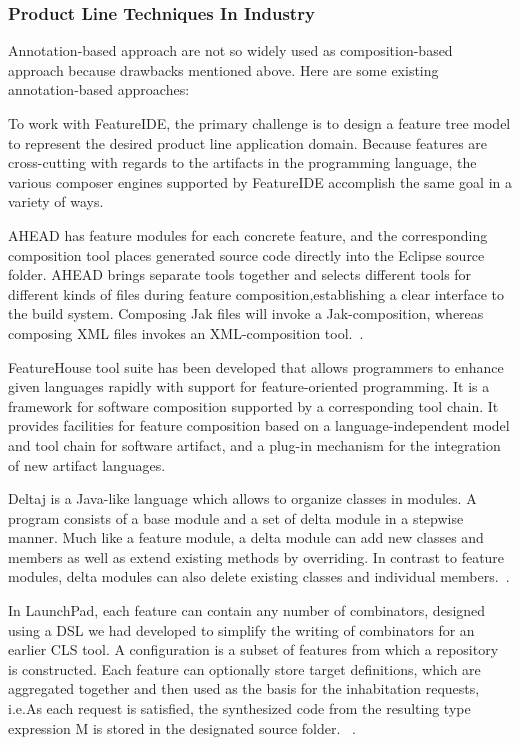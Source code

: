 \subsubsection{Product Line Techniques In Industry}

Annotation-based approach are not so widely used as composition-based
approach because drawbacks mentioned above. Here are some existing
annotation-based approaches:




To work with FeatureIDE, the primary challenge is to design a feature
tree model to represent the desired product line application domain.
Because features are cross-cutting with regards to the artifacts in the
programming language, the various composer engines supported by
FeatureIDE accomplish the same goal in a variety of ways.

AHEAD has feature modules for each concrete feature, and the
corresponding composition tool places generated source code directly
into the Eclipse source folder. AHEAD brings separate tools together and
selects different tools for different kinds of files during feature
composition,establishing a clear interface to the build system.
Composing Jak files will invoke a Jak-composition, whereas composing XML
files invokes an XML-composition
tool.~\cite{Batory2004FeatureorientedPA}.

FeatureHouse tool suite has been developed that allows programmers to
enhance given languages rapidly with support for feature-oriented
programming. It is a framework for software composition supported by a
corresponding tool chain. It provides facilities for feature composition
based on a language-independent model and tool chain for software
artifact, and a plug-in mechanism for the integration of new artifact
languages.~\cite{Apel:2009:FLA:1555001.1555038}

Deltaj is a Java-like language which allows to organize classes in
modules. A program consists of a base module and a set of delta module
in a stepwise manner. Much like a feature module, a delta module can add
new classes and members as well as extend existing methods by
overriding. In contrast to feature modules, delta modules can also
delete existing classes and individual
members.~\cite{Schaefer:2010:DPS:1885639.1885647}.

In LaunchPad, each feature can contain any number of combinators,
designed using a DSL we had developed to simplify the writing of
combinators for an earlier CLS tool. A configuration is a subset of
features from which a repository is constructed. Each feature can
optionally store target definitions, which are aggregated together and
then used as the basis for the inhabitation requests, i.e.As each
request is satisfied, the synthesized code from the resulting type
expression M is stored in the designated source folder.
~\cite{Heineman:2015:TMO:2791060.2791076}.

